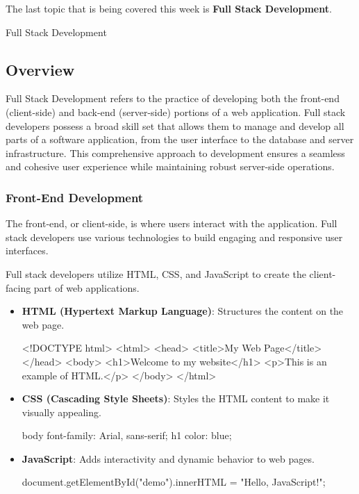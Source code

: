 The last topic that is being covered this week is \textbf{Full Stack Development}.

\begin{notes}{Full Stack Development}
    \subsection*{Overview}

    Full Stack Development refers to the practice of developing both the front-end (client-side) and back-end (server-side) portions of a web application. Full stack developers possess a broad skill 
    set that allows them to manage and develop all parts of a software application, from the user interface to the database and server infrastructure. This comprehensive approach to development ensures 
    a seamless and cohesive user experience while maintaining robust server-side operations.
    
    \subsubsection*{Front-End Development}
    
    The front-end, or client-side, is where users interact with the application. Full stack developers use various technologies to build engaging and responsive user interfaces.
    
    \begin{highlight}
    
        Full stack developers utilize HTML, CSS, and JavaScript to create the client-facing part of web applications.
        
        \begin{itemize}
            \item \textbf{HTML (Hypertext Markup Language)}: Structures the content on the web page.
    \begin{code}[HTML]
    <!DOCTYPE html>
    <html>
        <head>
            <title>My Web Page</title>
        </head>
        <body>
            <h1>Welcome to my website</h1>
            <p>This is an example of HTML.</p>
        </body>
    </html>
    \end{code}
            \item \textbf{CSS (Cascading Style Sheets)}: Styles the HTML content to make it visually appealing.
    \begin{code}[CSS]
    body {
        font-family: Arial, sans-serif;
    }
    h1 {
        color: blue;
    }
    \end{code}
            \item \textbf{JavaScript}: Adds interactivity and dynamic behavior to web pages.
    \begin{code}[JavaScript]
    document.getElementById("demo").innerHTML = "Hello, JavaScript!";
    \end{code}
        \end{itemize}
    

\end{highlight}
\end{notes}
